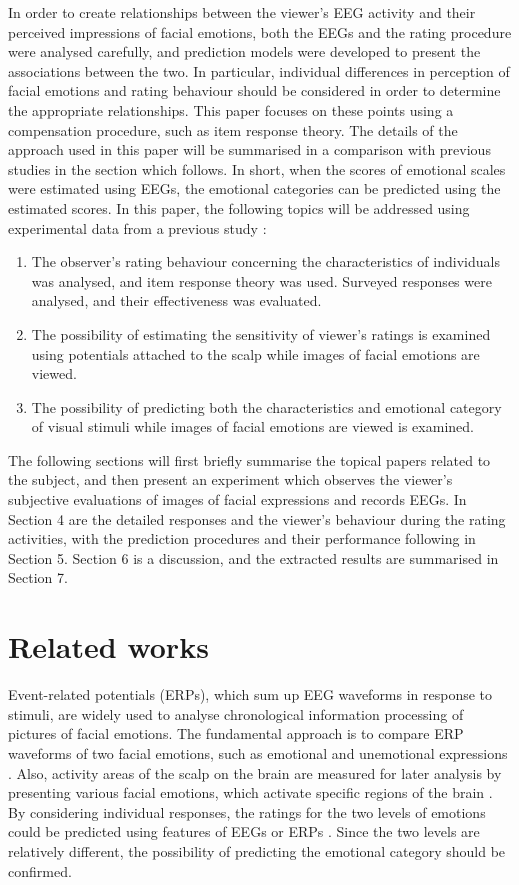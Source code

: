 \documentclass[fonts]{icst}
\begin{document}
In order to create relationships between the viewer's EEG activity and 
their perceived impressions of facial emotions, both the EEGs and the
rating procedure were analysed carefully, and prediction models were
developed to present the associations between the two.
In particular, individual differences in perception of facial emotions
and rating behaviour should be considered in order to determine the
appropriate relationships. 
This paper focuses on these points using a compensation
procedure, such as item response theory. 
The details of the approach used in this paper will be
summarised in a comparison with previous studies in the section which
follows.   
In short, when the scores of emotional scales were estimated using EEGs,  
the emotional categories can be predicted using the estimated scores.
In this paper, the following topics will be addressed using experimental
data from a previous study \cite{minoru19}:
\begin{enumerate}
\item The observer's rating behaviour concerning the characteristics of
      individuals was analysed, and item response theory was used.
      Surveyed responses were analysed, and their effectiveness was
      evaluated.  
\item The possibility of estimating the sensitivity of viewer's ratings
      is examined using potentials attached to the scalp while images of
      facial emotions are viewed. 
\item The possibility of predicting both the characteristics and
      emotional category of visual stimuli while images of facial
      emotions are viewed is examined. 
\end{enumerate}

The following sections will first briefly summarise the topical papers
related to the subject, 
and then present an experiment which observes the viewer's subjective
evaluations of images of facial expressions and records EEGs. 
In Section 4 are the detailed responses and the viewer's behaviour
during the rating activities, with the prediction procedures and their
performance following in Section 5. 
Section 6 is a discussion, and the extracted results are summarised 
in Section 7.


\section{Related works}

Event-related potentials (ERPs), which sum up EEG waveforms in response
to stimuli, are widely used to analyse chronological information
processing of pictures of facial emotions. 
The fundamental approach is to compare ERP waveforms of two facial
emotions, such as emotional and unemotional expressions
\cite{holmes02,holmes08}.  
Also, activity areas of the scalp on the brain are measured for later
analysis by presenting various facial emotions, which activate specific
regions of the brain \cite{batty:2003:EPS,holmes07}. 
By considering individual responses, the ratings for the two levels of 
emotions could be predicted using features of EEGs or ERPs
\cite{minoru19}.  
Since the two levels are relatively different, the possibility of
predicting the emotional category should be confirmed.
\end{document}
